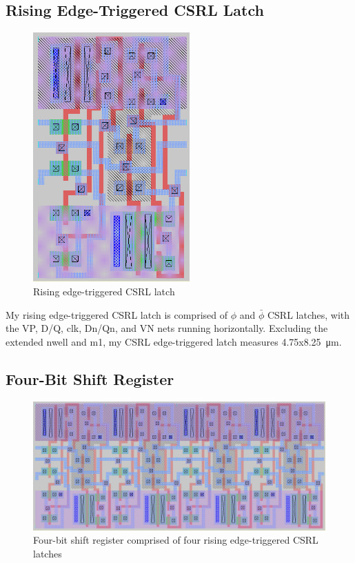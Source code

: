 \documentclass[11pt]{article}
\begin{document}
\subsection*{Rising Edge-Triggered CSRL Latch}
\begin{figure}[H]
  \centering
  \includegraphics[width=6cm]{media/rising_edge_csrl.png}
  \caption{Rising edge-triggered CSRL latch}
\end{figure}

My rising edge-triggered CSRL latch is comprised of $\phi$ and $\bar{\phi}$  CSRL latches, with the VP, D/Q, clk, Dn/Qn, and VN nets running horizontally. Excluding the extended nwell and m1, my CSRL edge-triggered latch measures 4.75x\qty{8.25}{\micro\meter}.

\subsection*{Four-Bit Shift Register}
\begin{figure}[H]
  \centering
  \includegraphics[width=\linewidth]{media/rising_edge_shift_register.png}
  \caption{Four-bit shift register comprised of four rising edge-triggered CSRL latches }
\end{figure}
\end{document}
